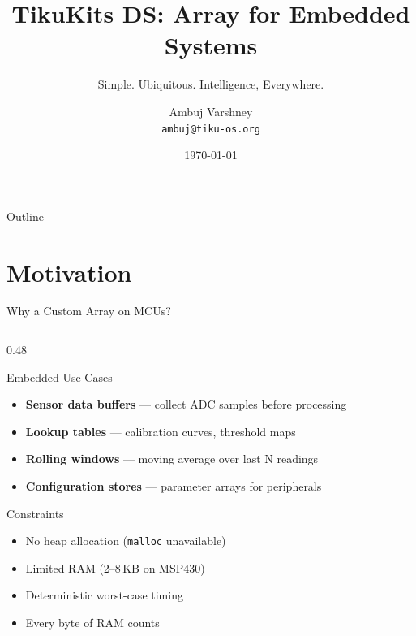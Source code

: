 \documentclass[aspectratio=169, 10pt]{beamer}
\title[TikuKits DS]{TikuKits DS: Array for Embedded Systems}
\subtitle{Simple. Ubiquitous. Intelligence, Everywhere.}
\author[Ambuj Varshney]{Ambuj Varshney \\ \texttt{ambuj@tiku-os.org}}
\date{\today}
\begin{document}
\begin{frame}
\titlepage
\end{frame}

\begin{frame}{Outline}
\tableofcontents
\end{frame}

\section{Motivation}

\begin{frame}{Why a Custom Array on MCUs?}
\begin{columns}[T]
\begin{column}{0.48\textwidth}
\begin{block}{Embedded Use Cases}
\begin{itemize}
  \item \textbf{Sensor data buffers} --- collect ADC samples before processing
  \item \textbf{Lookup tables} --- calibration curves, threshold maps
  \item \textbf{Rolling windows} --- moving average over last N readings
  \item \textbf{Configuration stores} --- parameter arrays for peripherals
\end{itemize}
\end{block}

\begin{block}{Constraints}
\begin{itemize}
  \item No heap allocation (\texttt{malloc} unavailable)
  \item Limited RAM (2--8\,KB on MSP430)
  \item Deterministic worst-case timing
  \item Every byte of RAM counts
\end{itemize}
\end{block}
\end{column}


\end{columns}
\end{frame}
\end{document}
